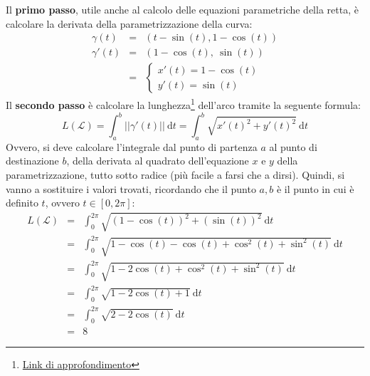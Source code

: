 \documentclass[a4paper]{article}
\begin{document}
	\noindent
	Il \textbf{primo passo}, utile anche al calcolo delle equazioni parametriche della retta, è calcolare la derivata della parametrizzazione della curva:
	\begin{equation*}
		\begin{array}{rcl}
			\gamma\left(t\right) &=& \left(t-\sin\left(t\right), 1-\cos\left(t\right)\right) \\ [.5em]
			\gamma'\left(t\right) &=& \left(1-\cos\left(t\right), \: \sin\left(t\right)\right) \\ [1em]
			&=& \begin{cases}
				x'\left(t\right) = 1-\cos\left(t\right) \\
				y'\left(t\right) = \sin\left(t\right)
			\end{cases}
		\end{array}
	\end{equation*}
	Il \textbf{secondo passo} è calcolare la lunghezza\footnote{\href{https://www.youmath.it/lezioni/analisi-due/varie/716-come-calcolare-la-lunghezza-di-una-curva.html}{Link di approfondimento}} dell'arco tramite la seguente formula:
	\begin{equation*}
		L\left(\mathcal{L}\right) = \displaystyle\int_{a}^{b} || \gamma'\left(t\right) || \: \mathrm{d}t = \displaystyle\int_{a}^{b} \sqrt{x'\left(t\right)^{2} + y'\left(t\right)^{2}} \: \mathrm{d}t
	\end{equation*}
	Ovvero, si deve calcolare l'integrale dal punto di partenza $a$ al punto di destinazione $b$, della derivata al quadrato dell'equazione $x$ e $y$ della parametrizzazione, tutto sotto radice (più facile a farsi che a dirsi). Quindi, si vanno a sostituire i valori trovati, ricordando che il punto $a,b$ è il punto in cui è definito $t$, ovvero $t \in \left[0,2\pi\right]$:
	\begin{equation*}
		\begin{array}{rcl}
			L\left(\mathcal{L}\right) &=& \displaystyle\int_{0}^{2\pi} \sqrt{\left(1-\cos\left(t\right)\right)^{2} + \left(\sin\left(t\right)\right)^{2}} \: \mathrm{d}t \\ [1em]
			&=& \displaystyle\int_{0}^{2\pi} \sqrt{1 - \cos\left(t\right) - \cos\left(t\right) + \cos^{2}\left(t\right) + \sin^{2}\left(t\right)} \: \mathrm{d}t \\ [1em]
			&=& \displaystyle\int_{0}^{2\pi} \sqrt{1 - 2\cos\left(t\right) + \cos^{2}\left(t\right) + \sin^{2}\left(t\right)} \: \mathrm{d}t \\ [1em]
			&=& \displaystyle\int_{0}^{2\pi} \sqrt{1 - 2\cos\left(t\right) + 1} \: \mathrm{d}t \\ [1em]
			&=& \displaystyle\int_{0}^{2\pi} \sqrt{2 - 2\cos\left(t\right)} \: \mathrm{d}t \\ [1em]
			&=& 8
		\end{array}
	\end{equation*}
\end{document}
